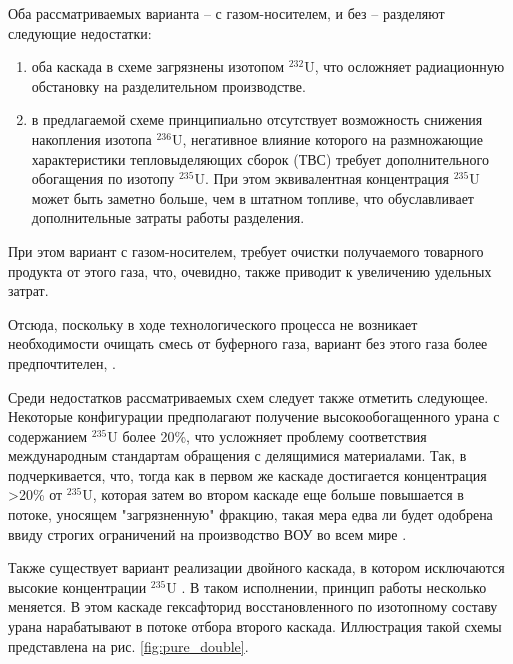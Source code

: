 Оба рассматриваемых варианта -- с газом-носителем, и без -- разделяют следующие недостатки:
\begin{enumerate}
  \item оба каскада в схеме загрязнены изотопом $^{232}$U, что осложняет радиационную обстановку на разделительном производстве.
  \item в предлагаемой схеме принципиально отсутствует возможность снижения накопления изотопа $^{236}$U, негативное влияние которого на размножающие характеристики тепловыделяющих сборок (ТВС) требует дополнительного обогащения по изотопу $^{235}$U. При этом эквивалентная концентрация $^{235}$U может быть заметно больше, чем в штатном топливе, что обуславливает дополнительные затраты работы разделения.
\end{enumerate}

При этом вариант с газом-носителем, требует очистки получаемого товарного продукта от этого газа, что, очевидно, также приводит к увеличению удельных затрат.

Отсюда, поскольку в ходе технологического процесса не возникает необходимости очищать смесь от буферного газа, вариант без этого газа более предпочтителен, \cite{smirnovKaskadnyeShemyZadachah2012}.

Среди недостатков рассматриваемых схем следует также отметить следующее.
Некоторые конфигурации предполагают получение высокообогащенного урана с содержанием $^{235}$U более 20\%, что усложняет проблему соответствия международным стандартам обращения с делящимися материалами.
Так, в \cite{palkinPurificationReprocessedUranium2016} подчеркивается, что, тогда как в первом же каскаде достигается концентрация >20\% от $^{235}$U, которая затем во втором каскаде еще больше повышается в потоке, уносящем "загрязненную" фракцию, такая мера едва ли будет одобрена ввиду строгих ограничений на производство ВОУ во всем мире \cite{ManagementHighEnriched2005}.

Также существует вариант реализации двойного каскада, в котором исключаются высокие концентрации $^{235}$U \cite{zhurinSposobIzotopnogoVosstanovleniya2010}.
В таком исполнении, принцип работы несколько меняется.
В этом каскаде гексафторид восстановленного по изотопному составу урана нарабатывают в потоке отбора второго каскада.
Иллюстрация такой схемы представлена на рис. \ref{fig:pure_double}.

